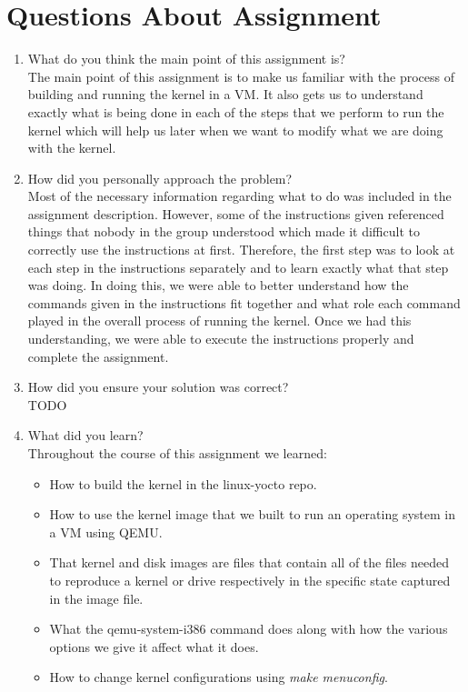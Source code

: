 \documentclass[onecolumn,draftclsnofoot, 10pt, compsoc]{IEEEtran}
\begin{document}
\section{Questions About Assignment}
	\begin{enumerate}
		\item What do you think the main point of this assignment is? \\
			The main point of this assignment is to make us familiar with the process of building and running the kernel in a VM.
			It also gets us to understand exactly what is being done in each of the steps that we perform to run the kernel which will help us later when we want to modify what we are doing with the kernel.
		\item How did you personally approach the problem? \\
			Most of the necessary information regarding what to do was included in the assignment description.
			However, some of the instructions given referenced things that nobody in the group understood which made it difficult to correctly use the instructions at first.
			Therefore, the first step was to look at each step in the instructions separately and to learn exactly what that step was doing.
			In doing this, we were able to better understand how the commands given in the instructions fit together and what role each command played in the overall process of running the kernel.
			Once we had this understanding, we were able to execute the instructions properly and complete the assignment.
		\item How did you ensure your solution was correct? \\
			TODO
		\item What did you learn? \\
			Throughout the course of this assignment we learned:
			\begin{itemize}
				\item
					How to build the kernel in the linux-yocto repo.
				\item
					How to use the kernel image that we built to run an operating system in a VM using QEMU.
				\item 
					That kernel and disk images are files that contain all of the files needed to reproduce a kernel or drive respectively in the specific state captured in the image file.
				\item 
					What the qemu-system-i386 command does along with how the various options we give it affect what it does.
				\item 
					How to change kernel configurations using \textit{make menuconfig}.		
			\end{itemize}
	\end{enumerate}
\end{document}
